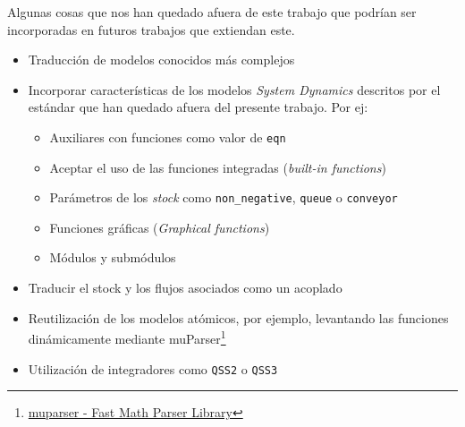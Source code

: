 Algunas cosas que nos han quedado afuera de este trabajo que podrían ser incorporadas en futuros trabajos que extiendan este.

\begin{itemize}
	\item Traducción de modelos conocidos más complejos
	\item Incorporar características de los modelos \textit{System Dynamics} descritos por el estándar que han quedado afuera del presente trabajo. Por ej:
	\begin{itemize}
		\item Auxiliares con funciones como valor de \texttt{eqn}
		\item Aceptar el uso de las funciones integradas (\textit{built-in functions})
		\item Parámetros de los \textit{stock} como \texttt{non\_negative}, \texttt{queue} o \texttt{conveyor}
		\item Funciones gráficas (\textit{Graphical functions}) 
		\item Módulos y submódulos
	\end{itemize}
	\item Traducir el stock y los flujos asociados como un acoplado
	\item Reutilización de los modelos atómicos, por ejemplo, levantando las funciones dinámicamente mediante muParser\footnote{\href{http://beltoforion.de/article.php?a=muparser}{muparser - Fast Math Parser Library}} 
	\item Utilización de integradores como \texttt{QSS2} o \texttt{QSS3}
\end{itemize}